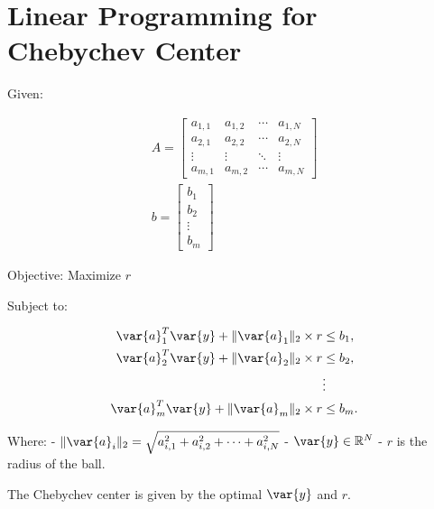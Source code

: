 \documentclass{article}
\begin{document}
\section*{Linear Programming for Chebychev Center}

Given:

\[
\begin{array}{c}
A = \begin{bmatrix}
a_{1,1} & a_{1,2} & \cdots & a_{1,N} \\
a_{2,1} & a_{2,2} & \cdots & a_{2,N} \\
\vdots & \vdots & \ddots & \vdots \\
a_{m,1} & a_{m,2} & \cdots & a_{m,N}
\end{bmatrix} \\
b = \begin{bmatrix} b_1 \\ b_2 \\ \vdots \\ b_m \end{bmatrix}
\end{array}
\]

Objective: Maximize \( r \)

Subject to:

\[
\begin{aligned}
\var{a}_1^T \var{y} + \|\var{a}_1\|_2 \times r & \leq b_1, \\
\var{a}_2^T \var{y} + \|\var{a}_2\|_2 \times r & \leq b_2, \\
& \vdots \\
\var{a}_m^T \var{y} + \|\var{a}_m\|_2 \times r & \leq b_m.
\end{aligned}
\]

Where:
- \( \|\var{a}_i\|_2 = \sqrt{a_{i,1}^2 + a_{i,2}^2 + \cdots + a_{i,N}^2} \)
- \( \var{y} \in \mathbb{R}^N \)
- \( r \) is the radius of the ball.

The Chebychev center is given by the optimal \( \var{y} \) and \( r \).
\end{document}
